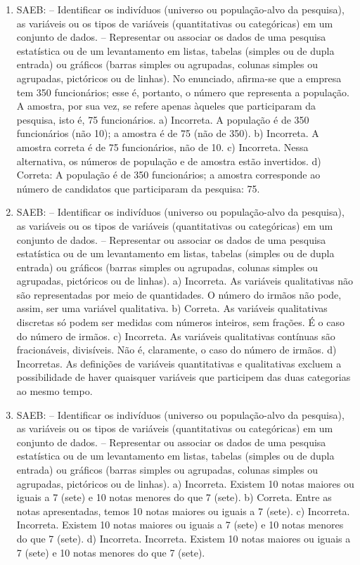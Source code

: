 \begin{enumerate}
\item
SAEB:
– Identificar os indivíduos (universo ou população-alvo da pesquisa),
as variáveis ou os tipos de variáveis (quantitativas ou categóricas) em 
um conjunto de dados.
– Representar ou associar os dados de uma pesquisa estatística ou
de um levantamento em listas, tabelas (simples ou de dupla entrada) ou
gráficos (barras simples ou agrupadas, colunas simples ou agrupadas,
pictóricos ou de linhas).
No enunciado, afirma-se que a empresa tem 350 funcionários; esse 
é, portanto, o número que representa a população. A amostra, por sua vez, 
se refere apenas àqueles que participaram da pesquisa, isto é, 75
funcionários.
a) Incorreta. A população é de 350 funcionários (não 10); a amostra é de
75 (não de 350).
b) Incorreta. A amostra correta é de 75 funcionários, não de 10.
c) Incorreta. Nessa alternativa, os números de população e de amostra
estão invertidos.
d) Correta: A população é de 350 funcionários; a amostra corresponde ao
número de candidatos que participaram da pesquisa: 75.

\item
SAEB:
– Identificar os indivíduos (universo ou população-alvo da pesquisa),
as variáveis ou os tipos de variáveis (quantitativas ou categóricas) em 
um conjunto de dados.
– Representar ou associar os dados de uma pesquisa estatística ou
de um levantamento em listas, tabelas (simples ou de dupla entrada) ou
gráficos (barras simples ou agrupadas, colunas simples ou agrupadas,
pictóricos ou de linhas).
a) Incorreta. As variáveis qualitativas não são representadas por 
meio de quantidades. O número do irmãos não pode, assim, ser uma variável 
qualitativa.
b) Correta. As variáveis qualitativas discretas só podem ser medidas
com números inteiros, sem frações. É o caso do número de irmãos. 
c) Incorreta. As variáveis qualitativas contínuas são fracionáveis,
divisíveis. Não é, claramente, o caso do número de irmãos. 
d) Incorretas. As definições de variáveis quantitativas e qualitativas
excluem a possibilidade de haver quaisquer variáveis que participem das
duas categorias ao mesmo tempo.

\item
SAEB:
– Identificar os indivíduos (universo ou população-alvo da pesquisa),
as variáveis ou os tipos de variáveis (quantitativas ou categóricas) em 
um conjunto de dados.
– Representar ou associar os dados de uma pesquisa estatística ou
de um levantamento em listas, tabelas (simples ou de dupla entrada) ou
gráficos (barras simples ou agrupadas, colunas simples ou agrupadas,
pictóricos ou de linhas).
a) Incorreta. Existem 10 notas maiores ou iguais a 7 (sete) e 10 notas menores do que 7 (sete).
b) Correta. Entre as notas apresentadas, temos 10 notas maiores ou iguais
a 7 (sete).
c) Incorreta. Incorreta. Existem 10 notas maiores ou iguais a 7 (sete) e 10 notas menores do que 7 (sete).
d) Incorreta. Incorreta. Existem 10 notas maiores ou iguais a 7 (sete) e 10 notas menores do que 7 (sete).
\end{enumerate}

